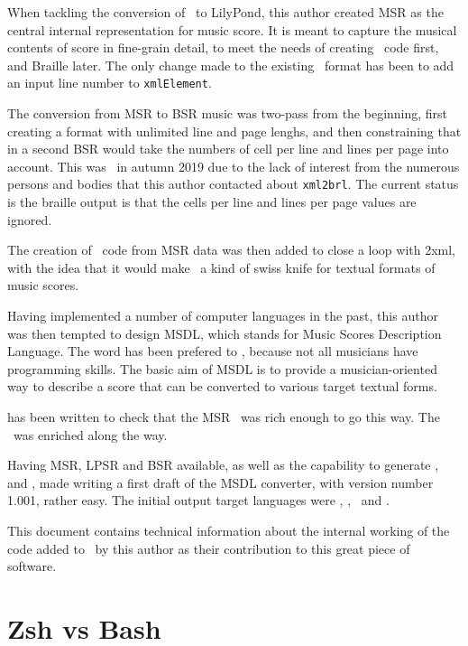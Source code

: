 When tackling the conversion of \mxml\ to LilyPond, this author created MSR as the central internal representation for music score. It is meant to capture the musical contents of score in fine-grain detail, to meet the needs of creating \lily\ code first, and Braille later.
The only change made to the existing \mxsrRepr\ format has been to add an input line number to {\tt xmlElement}.

The conversion from MSR to BSR music was two-pass from the beginning, first creating a \bsrRepr format with unlimited line and page lenghs, and then constraining that in a second BSR would take the numbers of cell per line and lines per page into account.
This was \frozen\ in autumn 2019 due to the lack of interest from the numerous persons and bodies that this author contacted about {\tt xml2brl}.
The current status is the braille output is that the cells per line and lines per page values are ignored.

The creation of \mxml\ code from MSR data was then added to close a loop with \mxml2xml, with the idea that it would make \mf\ a kind of swiss knife for textual formats of music scores.

Having implemented a number of computer languages in the past, this author was then tempted to design MSDL, which stands for Music Scores Description Language. The word  has been prefered to , because not all musicians have programming skills.
The basic aim of MSDL is to provide a musician-oriented way to describe a score that can be converted to various target textual forms.

 has been written to check that the MSR \API\ was rich enough to go this way. The \API\ was enriched along the way.

Having MSR, LPSR and BSR available, as well as the capability to generate \mxml, \lily\, \guido and \braille, made writing a first draft of the MSDL converter, with version number 1.001, rather easy. The initial output target languages were \mxml, \lily, \mxml\ and \braille.

This document contains technical information about the internal working of the code added to \mf\ by this author as their contribution to this great piece of software.


\section{Zsh vs Bash}

